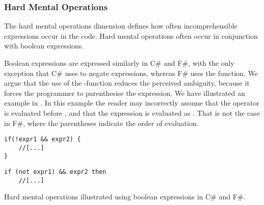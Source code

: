 \subsubsection{Hard Mental Operations}
The hard mental operations dimension defines how often incomprehensible expressions occur in the code. Hard mental operations often occur in conjunction with boolean expressions\cite{green1996usability}.

Boolean expressions are expressed similarly in C\# and F\#, with the only exception that C\# uses \ttt{!} to negate expressions, whereas F\# uses the  function. We argue that the use of the -function reduces the perceived ambiguity, because it forces the programmer to parenthesise the expression. We have illustrated an example in . In this example the reader may incorrectly assume that the \ttt{\&\&} operator is evaluated before \ttt{!}, and that the expression is evaluated as  . That is not the case in F\#, where the parentheses indicate the order of evaluation.

\begin{listing}[H]
    \begin{minipage}{.45\textwidth}
        \begin{verbatim}
if(!expr1 && expr2) {
    //[...]
}
        \end{verbatim}
    \end{minipage}
    \hfill
    \begin{minipage}{.45\textwidth}
        \begin{verbatim}
if (not expr1) && expr2 then
    //[...]
        \end{verbatim}
    \end{minipage}
\caption{Hard mental operations illustrated using boolean expressions in C\# and F\#.}
\label{lst:hard:mental:operations}
\end{listing}

